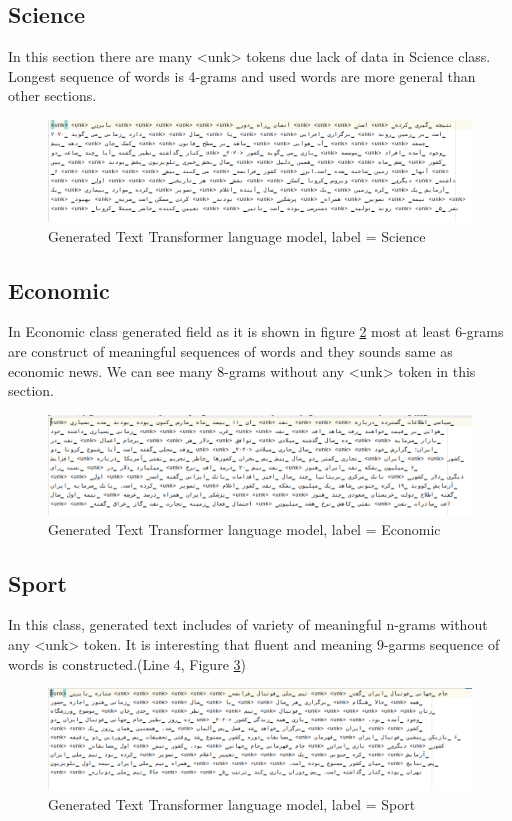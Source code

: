\subsection{Science}
In this section there are many <unk> tokens due lack of data in Science class. Longest sequence of words is 4-grams and used words are more general than other sections.
\begin{figure}
	\centering
	\includegraphics[width=15cm]{images/science.png}
	\caption{Generated Text Transformer language model, label = Science}
	\label{fig:science}
\end{figure}
\subsection{Economic}
In Economic class generated field as it is shown in figure \ref{fig:economic} most at least 6-grams are construct of meaningful sequences of words and they sounds same as economic news. We can see many 8-grams without any <unk> token in this section. 
\begin{figure}
	\centering
	\includegraphics[width=15cm]{images/economic.png}
	\caption{Generated Text Transformer language model, label = Economic}
	\label{fig:economic}
\end{figure}
\subsection{Sport}
In this class, generated text includes of variety of meaningful n-grams without any <unk> token. It is interesting that fluent and meaning 9-garms sequence of words is constructed.(Line 4, Figure \ref{fig:sport})
\begin{figure}
	\centering
	\includegraphics[width=15cm]{images/sport.png}
	\caption{Generated Text Transformer language model, label = Sport}
	\label{fig:sport}
\end{figure}
